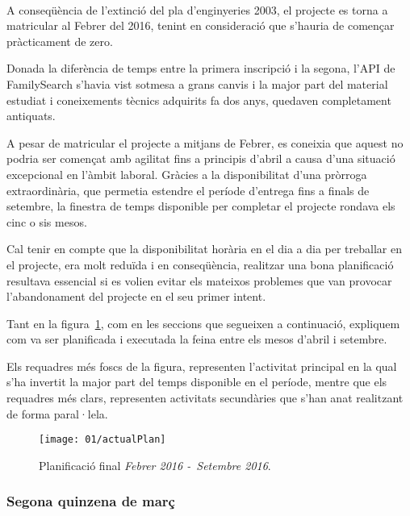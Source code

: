         \paragraph{}
        A  conseqüència de l’extinció del pla d’enginyeries 2003, el projecte es torna a matricular al Febrer del 2016, tenint en consideració que s'hauria de començar pràcticament de zero.

        Donada la diferència de temps entre la primera inscripció i la segona, l’\gls{API} de FamilySearch s'havia vist sotmesa a grans canvis i la major part del material estudiat i coneixements tècnics adquirits fa dos anys, quedaven completament antiquats.

        A pesar de matricular el projecte a mitjans de Febrer, es coneixia que aquest no podria ser començat amb agilitat fins a principis d’abril a causa d'una situació excepcional en l'àmbit laboral. Gràcies a la disponibilitat d’una pròrroga extraordinària, que permetia estendre el període d'entrega fins a finals de setembre, la finestra de temps disponible per completar el projecte rondava els cinc o sis mesos.

        Cal tenir en compte que la disponibilitat horària en el dia a dia per treballar en el projecte, era molt reduïda i en conseqüència, realitzar una bona planificació resultava essencial si es volien evitar els mateixos problemes que van provocar l’abandonament del projecte en el seu primer intent.

        Tant en la figura~\ref{fig:actualPlan}, com en les seccions que segueixen a continuació, expliquem com va ser planificada i executada la feina entre els mesos d'abril i setembre.

        Els requadres més foscs de la figura, representen l'activitat principal en la qual s'ha invertit la major part del temps disponible en el període, mentre que els requadres més clars, representen activitats secundàries que s'han anat realitzant de forma paral·lela.

        \begin{figure}[h]
            \texttt{[image: 01/actualPlan]}
            \centering
            \caption{Planificació final \emph{Febrer 2016 -\ Setembre 2016}.\label{fig:actualPlan}}
        \end{figure}

        \subsubsection{Segona quinzena de març}

